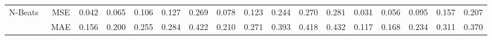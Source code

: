 \documentclass{article}
\begin{document}
\begin{table*}[htbp]
{\begin{tabular}{c|c|c|c|c|c|c|c|c|c|c|c|c|c|c|c|c}
\multirow{2}{*}{N-Beats~\cite{ Oreshkin2020NBeats}}            & MSE                               & 0.042                & 0.065              & 0.106                & 0.127                & 0.269               & 0.078                & 0.123                & 0.244                & 0.270                & 0.281                & 0.031                & 0.056               & 0.095                & 0.157               & 0.207               \\  
                                                & MAE                               & 0.156                & 0.200                & 0.255               & 0.284                & 0.422                & 0.210                & 0.271                & 0.393              & 0.418                & 0.432                & 0.117                & 0.168               & 0.234              & 0.311                & 0.370                \\ \hline




\end{tabular}}
\end{table*}
\end{document}
